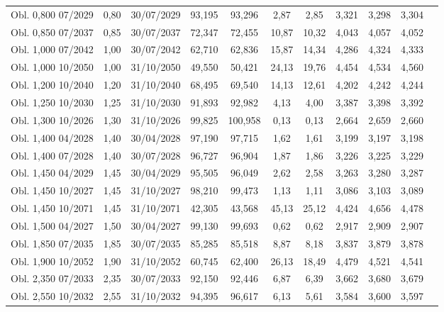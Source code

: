 \documentclass[a4paper,12pt]{article}
\begin{document}
\begin{longtable}{lcccccccccc}
Obl. 0,800 07/2029 & 0{,}80 & 30/07/2029 & 93{,}195 & 93{,}296 & 2{,}87 & 2{,}85 & 3{,}321 & 3{,}298 & 3{,}304 \\
Obl. 0,850 07/2037 & 0{,}85 & 30/07/2037 & 72{,}347 & 72{,}455 & 10{,}87 & 10{,}32 & 4{,}043 & 4{,}057 & 4{,}052 \\
Obl. 1,000 07/2042 & 1{,}00 & 30/07/2042 & 62{,}710 & 62{,}836 & 15{,}87 & 14{,}34 & 4{,}286 & 4{,}324 & 4{,}333 \\
Obl. 1,000 10/2050 & 1{,}00 & 31/10/2050 & 49{,}550 & 50{,}421 & 24{,}13 & 19{,}76 & 4{,}454 & 4{,}534 & 4{,}560 \\
Obl. 1,200 10/2040 & 1{,}20 & 31/10/2040 & 68{,}495 & 69{,}540 & 14{,}13 & 12{,}61 & 4{,}202 & 4{,}242 & 4{,}244 \\
Obl. 1,250 10/2030 & 1{,}25 & 31/10/2030 & 91{,}893 & 92{,}982 & 4{,}13 & 4{,}00 & 3{,}387 & 3{,}398 & 3{,}392 \\
Obl. 1,300 10/2026 & 1{,}30 & 31/10/2026 & 99{,}825 & 100{,}958 & 0{,}13 & 0{,}13 & 2{,}664 & 2{,}659 & 2{,}660 \\
Obl. 1,400 04/2028 & 1{,}40 & 30/04/2028 & 97{,}190 & 97{,}715 & 1{,}62 & 1{,}61 & 3{,}199 & 3{,}197 & 3{,}198 \\
Obl. 1,400 07/2028 & 1{,}40 & 30/07/2028 & 96{,}727 & 96{,}904 & 1{,}87 & 1{,}86 & 3{,}226 & 3{,}225 & 3{,}229 \\
Obl. 1,450 04/2029 & 1{,}45 & 30/04/2029 & 95{,}505 & 96{,}049 & 2{,}62 & 2{,}58 & 3{,}263 & 3{,}280 & 3{,}287 \\
Obl. 1,450 10/2027 & 1{,}45 & 31/10/2027 & 98{,}210 & 99{,}473 & 1{,}13 & 1{,}11 & 3{,}086 & 3{,}103 & 3{,}089 \\
Obl. 1,450 10/2071 & 1{,}45 & 31/10/2071 & 42{,}305 & 43{,}568 & 45{,}13 & 25{,}12 & 4{,}424 & 4{,}656 & 4{,}478 \\
Obl. 1,500 04/2027 & 1{,}50 & 30/04/2027 & 99{,}130 & 99{,}693 & 0{,}62 & 0{,}62 & 2{,}917 & 2{,}909 & 2{,}907 \\
Obl. 1,850 07/2035 & 1{,}85 & 30/07/2035 & 85{,}285 & 85{,}518 & 8{,}87 & 8{,}18 & 3{,}837 & 3{,}879 & 3{,}878 \\
Obl. 1,900 10/2052 & 1{,}90 & 31/10/2052 & 60{,}745 & 62{,}400 & 26{,}13 & 18{,}49 & 4{,}479 & 4{,}521 & 4{,}541 \\
Obl. 2,350 07/2033 & 2{,}35 & 30/07/2033 & 92{,}150 & 92{,}446 & 6{,}87 & 6{,}39 & 3{,}662 & 3{,}680 & 3{,}679 \\
Obl. 2,550 10/2032 & 2{,}55 & 31/10/2032 & 94{,}395 & 96{,}617 & 6{,}13 & 5{,}61 & 3{,}584 & 3{,}600 & 3{,}597 \\

\end{longtable}
\end{document}
